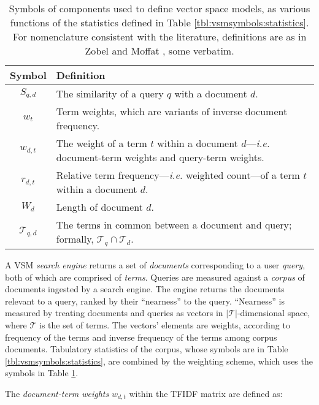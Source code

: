 \documentclass[11pt]{ucthesis}
\theoremstyle{plain}
\theoremstyle{definition}
\newcommand{\ie}{\emph{i.e.}\xspace}
\begin{document}
\begin{table}[htp]
\caption{\label{tbl:vsmsymbols:components}Symbols of components used to define vector space models, as various functions of the statistics defined in Table \ref{tbl:vsmsymbols:statistics}.  For nomenclature consistent with the literature, definitions are as in Zobel and Moffat \cite{zobel:sigir98}, some verbatim.}
\begin{center}
\begin{small}
\begin{tabular}{cp{5in}}
\toprule
Symbol & Definition \\
\midrule
$S_{q,d}$ & The similarity of a query $q$ with a document $d$. \\
$w_t$ & Term weights, which are variants of inverse document frequency. \\
$w_{d,t}$ & The weight of a term $t$ within a document $d$---\ie document-term weights and query-term weights. \\
$r_{d,t}$ & Relative term frequency---\ie weighted count---of a term $t$ within a document $d$.\\
$W_d$ & Length of document $d$. \\
$\mathcal{T}_{q,d}$ & The terms in common between a document and query; formally, $\mathcal{T}_q \cap \mathcal{T}_d$. \\
\bottomrule
\end{tabular}
\end{small}
\end{center}
\end{table}

A VSM \emph{search engine} returns a set of \emph{documents} corresponding to a user \emph{query}, both of which are comprised of \emph{terms}.  Queries are measured against a \emph{corpus} of documents ingested by a search engine.  The engine returns the documents relevant to a query, ranked by their ``nearness'' to the query.  ``Nearness'' is measured by treating documents and queries as vectors in $|\mathcal{T}|$-dimensional space, where $\mathcal{T}$ is the set of terms.  The vectors' elements are weights, according to frequency of the terms and inverse frequency of the terms among corpus documents.  Tabulatory statistics of the corpus, whose symbols are in Table \ref{tbl:vsmsymbols:statistics}, are combined by the weighting scheme, which uses the symbols in Table \ref{tbl:vsmsymbols:components}.

The \emph{document-term weights} $w_{d,t}$ within the TFIDF matrix are defined as:
\end{document}
